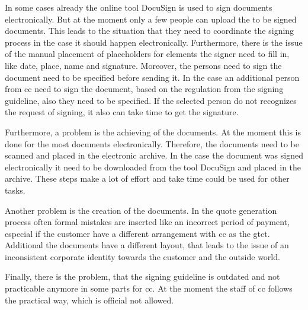 In some cases already the online tool DocuSign is used to sign documents electronically. But at the moment only a few people can upload the to be signed documents. This leads to the situation that they need to coordinate the signing process in the case it should happen electronically. Furthermore, there is the issue of the manual placement of placeholders for elements the signer need to fill in, like date, place, name and signature. Moreover, the persons need to sign the document need to be specified before sending it. In the case an additional person from \gls{cc} need to sign the document, based on the regulation from the signing guideline, also they need to be specified. If the selected person do not recognizes the request of signing, it also can take time to get the signature.

Furthermore, a problem is the achieving of the documents. At the moment this is done for the most documents electronically. Therefore, the documents need to be scanned and placed in the electronic archive. In the case the document was signed electronically it need to be downloaded from the tool DocuSign and placed in the archive. These steps make a lot of effort and take time could be used for other tasks.

Another problem is the creation of the documents. In the quote generation process often formal mistakes are inserted like an incorrect period of payment, especial if the customer have a different arrangement with \gls{cc} as the \gls{gtct}. Additional the documents have a different layout, that leads to the issue of an inconsistent corporate identity towards the customer and the outside world.

Finally, there is the problem, that the signing guideline is outdated and not practicable anymore in some parts for \gls{cc}. At the moment the staff of \gls{cc} follows the practical way, which is official not allowed. 
